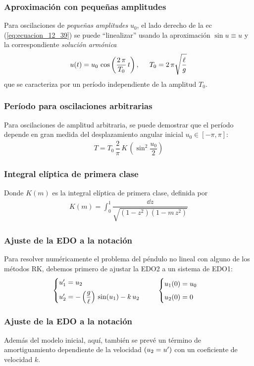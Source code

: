 \begin{frame}
\frametitle{Aproximación con pequeñas amplitudes}
Para oscilaciones de \emph{pequeñas amplitudes} $u_{0}$, el lado derecho de la ec (\ref{eq:ecuacion_12_39}) se puede \enquote{linealizar} usando la aproximación $\sin u \equiv u$ y la correspondiente \emph{solución armónica}
\begin{align*}
u(t) = u_{0} \, \cos \left( \dfrac{2 \, \pi}{T_{0}} \, t \right), \hspace{0.5cm} T_{0} = 2 \, \pi \sqrt{\dfrac{\ell}{g}}
\end{align*}
que se caracteriza por un período independiente de la amplitud $T_{0}$.
\end{frame}
\begin{frame}
\frametitle{Período para oscilaciones arbitrarias}
Para oscilaciones de amplitud arbitraria, se puede demostrar que el período depende en gran medida del desplazamiento angular inicial $u_{0} \in [-\pi, \pi]$:
\begin{align}
T = T_{0} \, \dfrac{2}{\pi} \, K \, \left( \sin^{2} \dfrac{u_{0}}{2} \right)
\label{eq:ecuacoin_12_41}
\end{align}
\end{frame}
\begin{frame}
\frametitle{Integral elíptica de primera clase}
Donde $K(m)$ es la integral elíptica de primera clase, definida por
\begin{align}
K(m) = \int_{0}^{1} \dfrac{\dd{z}}{\sqrt{(1 - z^{2})(1 - m \, z^{2})}}
\label{eq:ecuacion_12_42}
\end{align}
\end{frame}
\begin{frame}
\frametitle{Ajuste de la EDO a la notación}
Para resolver numéricamente el problema del péndulo no lineal con alguno de los métodos RK, debemos primero de ajustar la EDO2 a un sistema de EDO1:
\begin{align*}
\begin{cases}
{u}^{\prime}_{1} = u_{2} \\[0.5em]
{u}^{\prime}_{2} = -\left( \dfrac{g}{\ell} \right) \, \sin (u_{1}) - k \, u_{2}
\end{cases}
\hspace{0.5cm}
\begin{cases}
u_{1}(0) = u_{0} \\[0.5em]
u_{2}(0) = 0
\end{cases}
\end{align*}
\end{frame}
\begin{frame}
\frametitle{Ajuste de la EDO a la notación}
Además del modelo inicial, aquí, también se prevé un término de amortiguamiento dependiente de la velocidad $(u_{2} = {u}^{\prime})$ con un coeficiente de velocidad $k$.
\end{frame}
